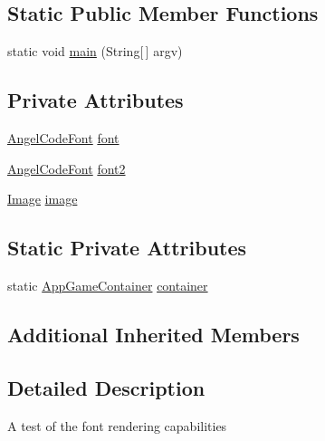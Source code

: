 \subsection*{Static Public Member Functions}
\begin{DoxyCompactItemize}
\item 
static void \mbox{\hyperlink{classorg_1_1newdawn_1_1slick_1_1tests_1_1_font_test_aeaa4c6efeea38900dd2fb188c8661f60}{main}} (String\mbox{[}$\,$\mbox{]} argv)
\end{DoxyCompactItemize}
\subsection*{Private Attributes}
\begin{DoxyCompactItemize}
\item 
\mbox{\hyperlink{classorg_1_1newdawn_1_1slick_1_1_angel_code_font}{Angel\+Code\+Font}} \mbox{\hyperlink{classorg_1_1newdawn_1_1slick_1_1tests_1_1_font_test_a34bca4d491b4c3abaf2c329d0dd097ce}{font}}
\item 
\mbox{\hyperlink{classorg_1_1newdawn_1_1slick_1_1_angel_code_font}{Angel\+Code\+Font}} \mbox{\hyperlink{classorg_1_1newdawn_1_1slick_1_1tests_1_1_font_test_a4d866583f8bf9a64f10e51a596658726}{font2}}
\item 
\mbox{\hyperlink{classorg_1_1newdawn_1_1slick_1_1_image}{Image}} \mbox{\hyperlink{classorg_1_1newdawn_1_1slick_1_1tests_1_1_font_test_a5f77dca50346852c2daeaadfeab96b56}{image}}
\end{DoxyCompactItemize}
\subsection*{Static Private Attributes}
\begin{DoxyCompactItemize}
\item 
static \mbox{\hyperlink{classorg_1_1newdawn_1_1slick_1_1_app_game_container}{App\+Game\+Container}} \mbox{\hyperlink{classorg_1_1newdawn_1_1slick_1_1tests_1_1_font_test_a752b5206f834ae0b0205d67dcb2aa18d}{container}}
\end{DoxyCompactItemize}
\subsection*{Additional Inherited Members}


\subsection{Detailed Description}
A test of the font rendering capabilities

